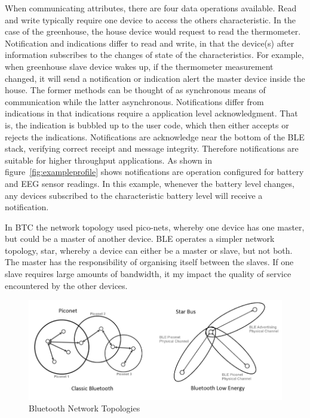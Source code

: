 \documentclass[]{article}
\begin{document}
When communicating attributes, there are four data operations available. Read and write typically require one device to access the others characteristic. In the case of the greenhouse, the house device would request to read the thermometer. Notification and indications differ to read and write, in that the device(s) after information subscribes to the changes of state of the characteristics. For example, when greenhouse slave device wakes up, if the thermometer measurement changed, it will send a notification or indication alert the master device inside the house. The former methods can be thought of as synchronous means of communication while the latter asynchronous. Notifications differ from indications in that indications require a application level acknowledgment. That is, the indication is bubbled up to the user code, which then either accepts or rejects the indications. Notifications are acknowledge near the bottom of the \ac{BLE} stack, verifying correct receipt and message integrity. Therefore notifications are suitable for higher throughput applications. As shown in figure~\ref{fig:exampleprofile} shows notifications are operation configured for battery and EEG sensor readings. In this example, whenever the battery level changes, any devices subscribed to the characteristic battery level will receive a notification.

In \ac{BTC} the network topology used pico-nets, whereby one device has one master, but could be a master of another device. \ac{BLE} operates a simpler network topology, star, whereby a device can either be a master or slave, but not both. The master has the responsibility of organising itself between the slaves. If one slave requires large amounts of bandwidth, it my impact the quality of service encountered by the other devices. 

\begin{figure}[htb]
	\begin{center}
		\includegraphics[width = \textwidth]{topology}
	\end{center}
	\caption{Bluetooth Network Topologies }
	\label{fig:topology}
\end{figure}
\end{document}

